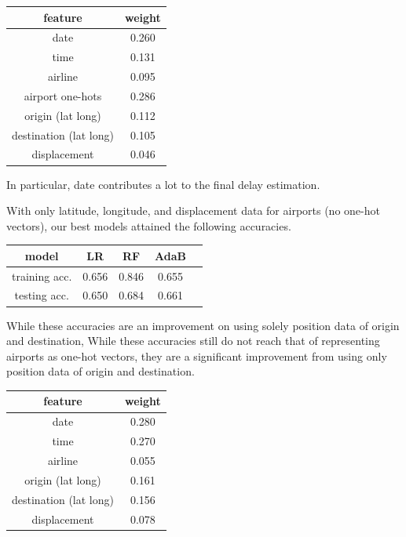 \documentclass{article}
\begin{document}
\begin{multicols}{2}
\begin{center}
    \begin{tabular}{c|c}
        feature & weight \\\hline
        date & 0.260 \\
        time & 0.131 \\
        airline & 0.095 \\
        airport one-hots & 0.286 \\
        origin (lat long) & 0.112 \\
        destination (lat long) & 0.105 \\
        displacement & 0.046
    \end{tabular}
\end{center}

In particular, date contributes a lot
to the final delay estimation.

With only latitude, longitude, and displacement data
for airports (no one-hot vectors),
our best models attained the following accuracies.

\begin{center}
    \begin{tabular}{c|cccc}
        model &
          LR & RF & AdaB \\\hline
        training acc. &
          0.656 & 0.846 & 0.655 \\
        testing acc. &
          0.650 & 0.684 & 0.661
    \end{tabular}
\end{center}

While these accuracies are an improvement
on using solely position data of origin and destination,
While these accuracies still do not reach that of
representing airports as one-hot vectors,
they are a significant improvement
from using only position data of origin and destination.

\begin{center}
    \begin{tabular}{c|c}
        feature & weight \\\hline
        date & 0.280 \\
        time & 0.270 \\
        airline & 0.055 \\
        origin (lat long) & 0.161 \\
        destination (lat long) & 0.156 \\
        displacement & 0.078
    \end{tabular}
\end{center}


\end{multicols}
\end{document}
